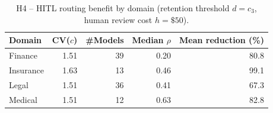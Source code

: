 \begin{table}[t]\centering\small
\caption{H4 -- HITL routing benefit by domain (retention threshold $d{=}c_3$,
human review cost $h{=}\$50$).}\label{tab:h4}
\begin{tabular}{lrrrr}
\toprule
Domain & CV($c$) & \#Models & Median $\rho$ & Mean reduction (\%) \\
\midrule
  Finance & 1.51 & 39 & 0.20 & 80.8 \\
  Insurance & 1.63 & 13 & 0.46 & 99.1 \\
  Legal & 1.51 & 36 & 0.41 & 67.3 \\
  Medical & 1.51 & 12 & 0.63 & 82.8 \\
\bottomrule
\end{tabular}
\end{table}